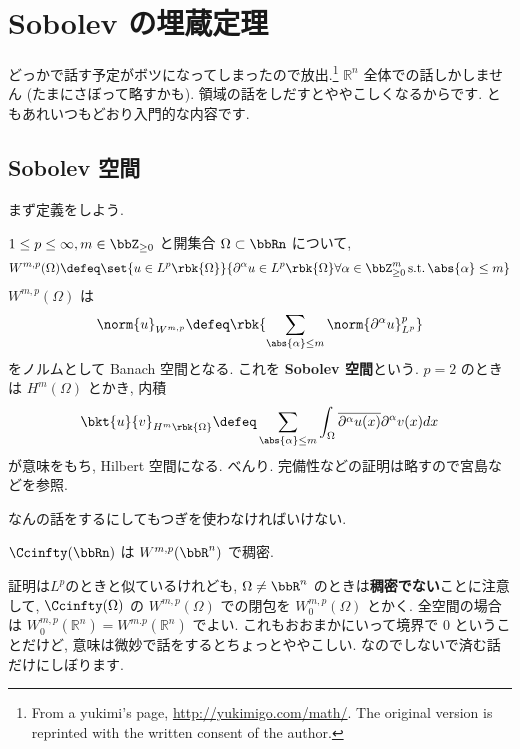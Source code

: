 \documentclass[openany, a4paper, oneside]{jsbook}
\begin{document}
\chapter{Sobolev の埋蔵定理}

どっかで話す予定がボツになってしまったので放出.\footnote{From a yukimi's page, \url{http://yukimigo.com/math/}.
The original version is reprinted with the written consent of the author.}
$\mathbb{R}^n$ 全体での話しかしません (たまにさぼって略すかも).
領域の話をしだすとややこしくなるからです.
ともあれいつもどおり入門的な内容です.


\section{Sobolev 空間}

まず定義をしよう.
\begin{defn}[Sobolev 空間]
 $1 \le p \le \infty, m \in \bbZ_{\ge 0}$
 と開集合 $\Omega \subset \bbRn$ について,
 \begin{align}
  W^{m, p}(\Omega)
  \defeq
  \set{u \in L^p \rbk{\Omega}}{\partial^{\alpha} u \in L^p \rbk{\Omega} \forall \alpha \in \bbZ_{\geq 0}^{m}\, \text{s.t.} \, \abs{\alpha} \le m }
 \end{align}
 $W^{m, p}(\Omega)$ は
 \begin{align}
  \norm{u}_{W^{m,p}}
  \defeq
  \rbk{\sum_{\abs{\alpha} \le m} \norm{\partial^{\alpha} u}_{L^p}^p}
 \end{align}
 をノルムとして Banach 空間となる.
 これを \textbf{Sobolev 空間}という.
 $p = 2$ のときは $H^m (\Omega)$ とかき, 内積
 \begin{align}
  \bkt{u}{v}_{H^m \rbk{\Omega}}
  \defeq
  \sum_{\abs{\alpha} \leq m}
  \int_{\Omega} \overline{\partial^{\alpha}u (x)} \partial^{\alpha}v (x) dx
 \end{align}
 が意味をもち, Hilbert 空間になる.
 べんり.
 完備性などの証明は略すので宮島\cite{ShizuoMiyajima1}などを参照.
\end{defn}
なんの話をするにしてもつぎを使わなければいけない.
\begin{thm}[Density]
 $\Ccinfty(\bbRn)$ は $W^{m, p}(\bbR^n)$ で稠密.
\end{thm}
\begin{rem}
 証明は$L^p$のときと似ているけれども, $\Omega \neq \bbR^n$ のときは\textbf{稠密でない}ことに注意して,
 $\Ccinfty (\Omega)$ の $W^{m, p}(\Omega)$ での閉包を $W_0^{m, p}(\Omega)$ とかく.
 全空間の場合は $W_0^{m, p}(\mathbb{R}^n) = W^{m. p}(\mathbb{R}^n)$ でよい.
 これもおおまかにいって境界で $0$ ということだけど, 意味は微妙で話をするとちょっとややこしい.
 なのでしないで済む話だけにしぼります.
\end{rem}
\end{document}
